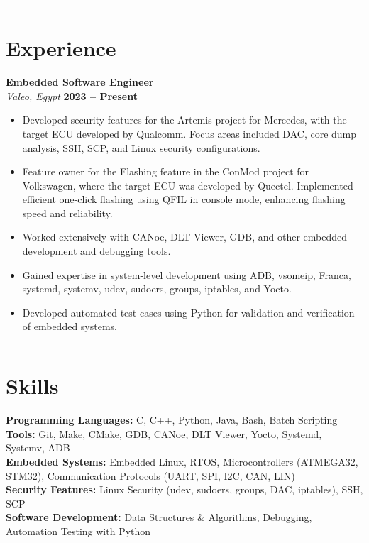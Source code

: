 \documentclass[a4paper,10pt]{article}
\begin{document}
\noindent\rule{\linewidth}{0.3mm} %

\section*{Experience}
\noindent
\textbf{Embedded Software Engineer} \\
\textit{Valeo, Egypt} \hfill \textbf{2023 – Present} \\
\begin{itemize}[leftmargin=*]
    \item Developed security features for the Artemis project for Mercedes, with the target ECU developed by Qualcomm. Focus areas included DAC, core dump analysis, SSH, SCP, and Linux security configurations.
    \item Feature owner for the Flashing feature in the ConMod project for Volkswagen, where the target ECU was developed by Quectel. Implemented efficient one-click flashing using QFIL in console mode, enhancing flashing speed and reliability.
    \item Worked extensively with CANoe, DLT Viewer, GDB, and other embedded development and debugging tools.
    \item Gained expertise in system-level development using ADB, vsomeip, Franca, systemd, systemv, udev, sudoers, groups, iptables, and Yocto.
    \item Developed automated test cases using Python for validation and verification of embedded systems.
\end{itemize}

\noindent\rule{\linewidth}{0.3mm} %

\section*{Skills}
\noindent
\textbf{Programming Languages:} C, C++, Python, Java, Bash, Batch Scripting \\
\textbf{Tools:} Git, Make, CMake, GDB, CANoe, DLT Viewer, Yocto, Systemd, Systemv, ADB \\
\textbf{Embedded Systems:} Embedded Linux, RTOS, Microcontrollers (ATMEGA32, STM32), Communication Protocols (UART, SPI, I2C, CAN, LIN) \\
\textbf{Security Features:} Linux Security (udev, sudoers, groups, DAC, iptables), SSH, SCP \\
\textbf{Software Development:} Data Structures \& Algorithms, Debugging, Automation Testing with Python
\end{document}
